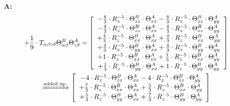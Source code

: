\documentclass{article}
\begin{document}
\textbf{A:}
\begin{subequations}\begin{gather}
+ \frac{1}{9} \cdot T_{\alpha{}\beta{}\gamma{}\delta{}} \Theta{}^{B}_{\alpha{}\beta{}} \Theta{}^{A}_{\gamma{}\delta{}} =  \left[ \begin{array}{c} 
 		- \frac{8}{3} \cdot R_{z}^{-5} \cdot \Theta{}^{B}_{zz} \cdot \Theta{}^{A}_{xx}- \frac{8}{3} \cdot R_{z}^{-5} \cdot \Theta{}^{B}_{zz} \cdot \Theta{}^{A}_{yy} 
 \\[0.2em] 		 - \frac{4}{3} \cdot R_{z}^{-5} \cdot \Theta{}^{B}_{zz} \cdot \Theta{}^{A}_{xx}- \frac{4}{3} \cdot R_{z}^{-5} \cdot \Theta{}^{B}_{zz} \cdot \Theta{}^{A}_{yy} 
 \\[0.2em] 		 + \frac{4}{3} \cdot R_{z}^{-5} \cdot \Theta{}^{B}_{xx} \cdot \Theta{}^{A}_{xx}+ \frac{4}{3} \cdot R_{z}^{-5} \cdot \Theta{}^{B}_{xx} \cdot \Theta{}^{A}_{yy} 
 \\[0.2em] 		 + \frac{4}{3} \cdot R_{z}^{-5} \cdot \Theta{}^{B}_{yy} \cdot \Theta{}^{A}_{xx}+ \frac{4}{3} \cdot R_{z}^{-5} \cdot \Theta{}^{B}_{yy} \cdot \Theta{}^{A}_{yy} 
 \\[0.2em] 		 + 1 \cdot R_{z}^{-5} \cdot \Theta{}^{B}_{xx} \cdot \Theta{}^{A}_{xx}+ \frac{1}{3} \cdot R_{z}^{-5} \cdot \Theta{}^{B}_{xx} \cdot \Theta{}^{A}_{yy} 
 \\[0.2em] 		 + \frac{1}{3} \cdot R_{z}^{-5} \cdot \Theta{}^{B}_{yy} \cdot \Theta{}^{A}_{xx}+ 1 \cdot R_{z}^{-5} \cdot \Theta{}^{B}_{yy} \cdot \Theta{}^{A}_{yy}
 \end{array}\right] 
\\ \xRightarrow{\text{added up}}
  \left[ \begin{array}{c} 
 		- 4 \cdot R_{z}^{-5} \cdot \Theta{}^{B}_{zz} \cdot \Theta{}^{A}_{xx}- 4 \cdot R_{z}^{-5} \cdot \Theta{}^{B}_{zz} \cdot \Theta{}^{A}_{yy} 
 \\[0.2em] 		 + \frac{7}{3} \cdot R_{z}^{-5} \cdot \Theta{}^{B}_{xx} \cdot \Theta{}^{A}_{xx}+ \frac{5}{3} \cdot R_{z}^{-5} \cdot \Theta{}^{B}_{xx} \cdot \Theta{}^{A}_{yy} 
 \\[0.2em] 		 + \frac{5}{3} \cdot R_{z}^{-5} \cdot \Theta{}^{B}_{yy} \cdot \Theta{}^{A}_{xx}+ \frac{7}{3} \cdot R_{z}^{-5} \cdot \Theta{}^{B}_{yy} \cdot \Theta{}^{A}_{yy}
 \end{array}\right] 
\end{gather}\end{subequations}
\end{document}
